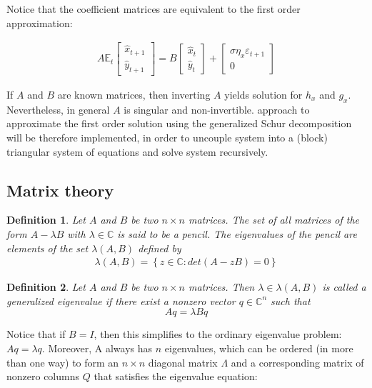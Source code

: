 \documentclass{pracamgr}
\numberwithin{equation}{section}
\newtheorem{mydef}{Definition}
\begin{document}
Notice that the coefficient matrices are equivalent to the first order approximation:

\begin{eqnarray}
A \mathbb{E}_t\begin{bmatrix} \widehat{x}_{t+1} \\ \widehat{y}_{t+1} \end{bmatrix} = B\begin{bmatrix} \widehat{x}_t\\ \widehat{y}_t \end{bmatrix} + \begin{bmatrix} \sigma \eta_x \varepsilon_{t+1} \\ 0\end{bmatrix}
\end{eqnarray}

If $A$ and $B$ are known matrices, then inverting $A$ yields solution for $h_x$ and $g_x$. Nevertheless, in general $A$ is singular and non-invertible. \cite{klein2000using} approach to approximate the first order solution using the generalized Schur decomposition will be therefore implemented, in order to uncouple system into a (block) triangular system of equations and solve system recursively.
 
\subsection{Matrix theory}

\begin{mydef}
Let $A$ and $B$ be two $n\times n$ matrices. The set of all matrices of the form $A-\lambda B$ with $\lambda \in \mathbb{C}$ is said to be a \emph{pencil}. The eigenvalues of the pencil are elements of the set $\lambda(A,B)$ defined by
  \begin{align*}
    \lambda(A,B) =  \left\{z \in \mathbb{C}:det(A-zB)=0\right\}
  \end{align*}
\end{mydef}

\begin{mydef}
Let $A$ and $B$ be two $n\times n$ matrices. Then $\lambda \in \lambda(A,B)$ is called a \emph{generalized eigenvalue} if there exist a nonzero vector $q\in \mathbb{C}^n$ such that $$A q = \lambda B q$$
\end{mydef}

Notice that if $B=I$, then this simplifies to the ordinary eigenvalue problem: $A q = \lambda q$. Moreover, A always has $n$ eigenvalues, which can be ordered (in more than one way) to form an $n\times n$ diagonal matrix $\Lambda$ and a corresponding matrix of nonzero columns $Q$ that satisfies the eigenvalue equation:
\end{document}
